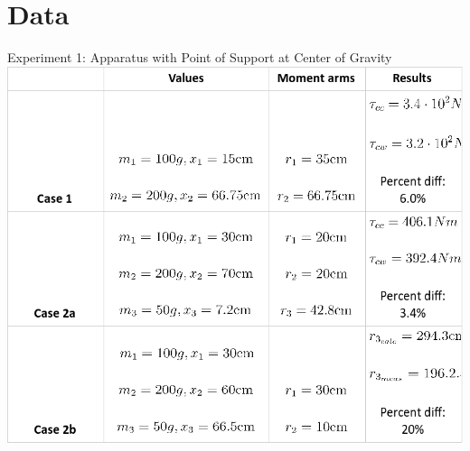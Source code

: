 \documentclass[12pt]{article}
\begin{document}
    \section{Data}
        {\large Experiment 1: Apparatus with Point of Support at Center of Gravity} \\
        \includegraphics[scale=0.5 ]{Table1.png} \\ \\
\end{document}

